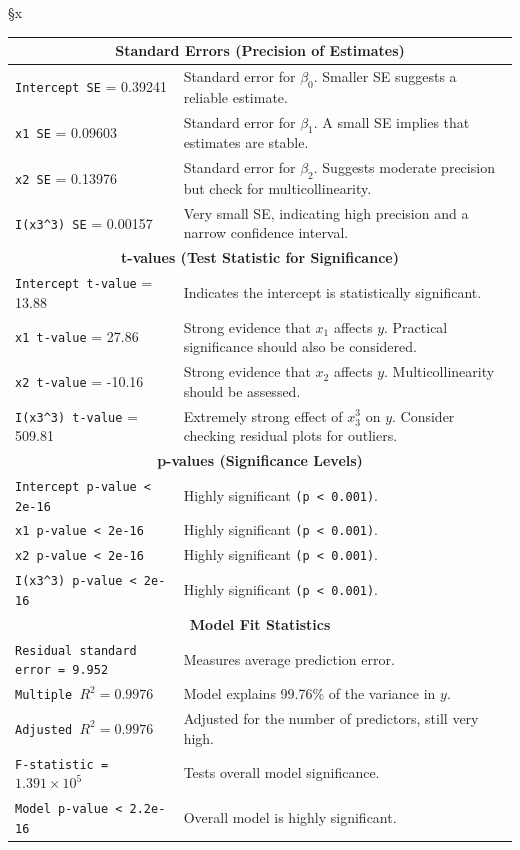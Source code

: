 §x\documentclass[]{article}
\begin{document}
\begin{longtable}{|p{}|p{}|}
	\hline
	\multicolumn{2}{|c|}{\textbf{Standard Errors (Precision of Estimates)}} \\
	\hline
	\texttt{Intercept SE} = 0.39241 & Standard error for $\beta_0$. Smaller SE suggests a reliable estimate. \\
	\hline
	\texttt{x1 SE} = 0.09603 & Standard error for $\beta_1$. A small SE implies that estimates are stable. \\
	\hline
	\texttt{x2 SE} = 0.13976 & Standard error for $\beta_2$. Suggests moderate precision but check for multicollinearity. \\
	\hline
	\texttt{I(x3\textasciicircum3) SE} = 0.00157 & Very small SE, indicating high precision and a narrow confidence interval. \\
	\hline
	\multicolumn{2}{|c|}{\textbf{t-values (Test Statistic for Significance)}} \\
	\hline
	\texttt{Intercept t-value} = 13.88 & Indicates the intercept is statistically significant. \\
	\hline
	\texttt{x1 t-value} = 27.86 & Strong evidence that $x_1$ affects $y$. Practical significance should also be considered. \\
	\hline
	\texttt{x2 t-value} = -10.16 & Strong evidence that $x_2$ affects $y$. Multicollinearity should be assessed. \\
	\hline
	\texttt{I(x3\textasciicircum3) t-value} = 509.81 & Extremely strong effect of $x_3^3$ on $y$. Consider checking residual plots for outliers. \\
	\hline


	\hline
	\multicolumn{2}{|c|}{\textbf{p-values (Significance Levels)}} \\
	\hline
	\texttt{Intercept p-value < 2e-16} & Highly significant \texttt{(p < 0.001)}. \\
	\hline
	\texttt{x1 p-value < 2e-16} & Highly significant \texttt{(p < 0.001)}. \\
	\hline
	\texttt{x2 p-value < 2e-16} & Highly significant \texttt{(p < 0.001)}. \\
	\hline
	\texttt{I(x3\textasciicircum3) p-value < 2e-16} & Highly significant \texttt{(p < 0.001)}. \\
	\hline

	\hline
	\multicolumn{2}{|c|}{\textbf{Model Fit Statistics}} \\
	\hline
	\texttt{Residual standard error = 9.952} & Measures average prediction error. \\
	\hline
	\texttt{Multiple $R^2 = 0.9976$} & Model explains 99.76\% of the variance in $y$. \\
	\hline
	\texttt{Adjusted $R^2 = 0.9976$} & Adjusted for the number of predictors, still very high. \\
	\hline
	\texttt{F-statistic = $1.391 \times 10^5$} & Tests overall model significance. \\
	\hline
	\texttt{Model p-value < 2.2e-16} & Overall model is highly significant. \\
	\hline
\end{longtable}
	
\end{document}
